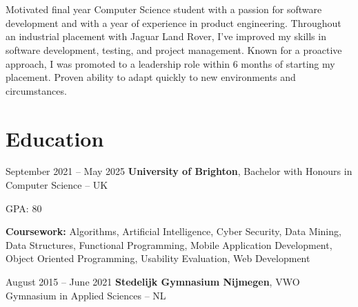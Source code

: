 



	\newcommand{\AND}{\unskip
		\cleaders\copy\ANDbox\hskip\wd\ANDbox
		\ignorespaces
	}
	\newsavebox\ANDbox
	\sbox\ANDbox{$|$}
	
	
	
	\vspace{-0.6cm}
	
	\section{}
	
	
	\begin{onecolentry}
		Motivated final year Computer Science student with a passion for software development and with a year of experience in product engineering. Throughout an industrial placement with Jaguar Land Rover, I’ve improved my skills in software development, testing, and project management. Known for a proactive approach, I was promoted to a leadership role within 6 months of starting my placement. Proven ability to adapt quickly to new environments and circumstances.
	\end{onecolentry}

	
	\section{Education}
	
	
	\begin{twocolentry}{
			September 2021 – May 2025
		}
		\textbf{University of Brighton}, Bachelor with Honours in Computer Science -- UK
	\end{twocolentry}
	
	\vspace{0.10 cm}
	\begin{onecolentry}
		\begin{highlights}
			\item GPA: 80
			\item \textbf{Coursework:} Algorithms, Artificial Intelligence, Cyber Security, Data Mining, Data Structures, Functional Programming, Mobile Application Development, Object Oriented Programming, Usability Evaluation, Web Development
		\end{highlights}
	\end{onecolentry}
	
	\vspace{0.2 cm}
	
	\begin{twocolentry}{
			August 2015 – June 2021
		}
		\textbf{Stedelijk Gymnasium Nijmegen}, VWO Gymnasium in Applied Sciences -- NL
	\end{twocolentry}
	
